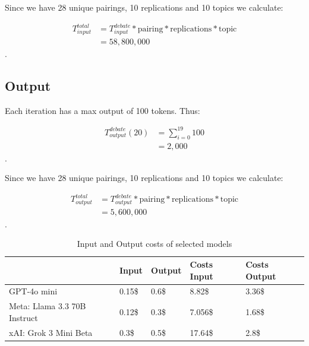 \documentclass[12pt]{article}
\begin{document}
\begin{multicols}{2}
Since we have 28 unique pairings, 10 replications and 10 topics we calculate:

\begin{align*}
    T^{total}_{input} &= T^{debate}_{input} * \text{pairing} *\text{replications} * \text{topic} \\
    &= 58{,}800{,}000
\end{align*}.

\subsection{Output}

Each iteration has a max output of 100 tokens. Thus:


\begin{align*}
    T^{debate}_{output}(20) &= \sum_{i=0}^{19}100 \\ %
    &= 2{,}000
\end{align*}.

Since we have 28 unique pairings, 10 replications and 10 topics we calculate:

\begin{align*}
    T^{total}_{output} &= T^{debate}_{output} * \text{pairing} *\text{replications} * \text{topic} \\
    &= 5,600,000
\end{align*}.
\end{multicols}


    
\begin{table}[ht!]
\begin{center}

\begin{tabular}{|l|l|l|l|l|}
\hline
                             & Input & Output & Costs Input & Costs Output   \\ \hline
GPT-4o mini                  & 0.15\$  & 0.6\$ & 8.82\$ & 3.36\$   \\\hline
Meta: Llama 3.3 70B Instruct & 0.12\$  & 0.3\$ & 7.056\$ & 1.68\$   \\\hline
xAI: Grok 3 Mini Beta        & 0.3\$   & 0.5\$ & 17.64\$ & 2.8\$ \\ \hline
\end{tabular}
\caption{Input and Output costs of selected models}
\end{center}

\end{table}





\begin{multicols}{2}
    







\end{multicols}
\end{document}
